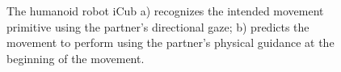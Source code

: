 \documentclass[runningheads,a4paper]{llncs}
\begin{document}
\begin{figure}[t]
\centering
\caption {The humanoid robot iCub a) recognizes the intended movement primitive using the partner's directional gaze; b) predicts the movement to perform using the partner's physical guidance at the beginning of the movement.}
\label{fig:idea}
\end{figure}


\end{document}
